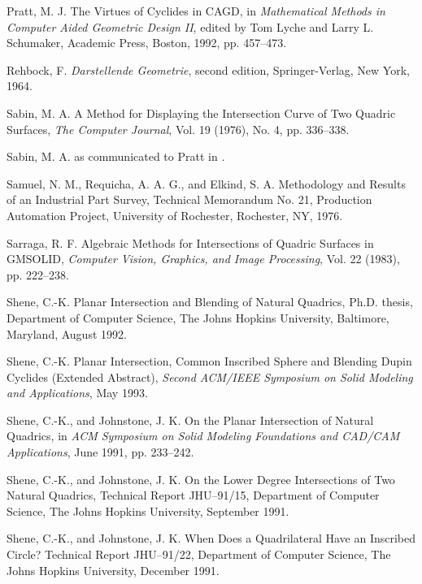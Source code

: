 \begin{thebibliography}{999}
     Pratt, M. J.
     The Virtues of Cyclides in CAGD,
     in {\em Mathematical Methods in Computer Aided Geometric Design II},
     edited by Tom Lyche and Larry L. Schumaker,
     Academic Press, Boston, 1992, pp. 457--473.

     Rehbock, F.
     {\em Darstellende Geometrie},
     second edition, Springer-Verlag, New York, 1964.

     Sabin, M. A.
     A Method for Displaying the Intersection Curve of Two Quadric Surfaces,
     {\em The Computer Journal},
     Vol. 19 (1976), No. 4, pp. 336--338.

     Sabin, M. A.
     as communicated to Pratt in \cite{pratt:1990}.

     Samuel, N. M., Requicha, A. A. G., and Elkind, S. A.
     Methodology and Results of an Industrial Part Survey,
     Technical Memorandum No. 21,
     Production Automation Project,
     University of Rochester, Rochester, NY, 1976.

     Sarraga, R. F.
     Algebraic Methods for Intersections of Quadric Surfaces in GMSOLID,
     {\em Computer Vision, Graphics, and Image Processing},
     Vol. 22 (1983), pp. 222--238.

     Shene, C.-K.
     Planar Intersection and Blending of Natural Quadrics,
     Ph.D. thesis,
     Department of Computer Science,
     The Johns Hopkins University,
     Baltimore, Maryland, August 1992.

     Shene, C.-K.
     Planar Intersection, Common Inscribed Sphere and Blending Dupin Cyclides
     (Extended Abstract),
     {\em Second ACM/IEEE Symposium on Solid Modeling and
     Applications}, May 1993.

     Shene, C.-K., and Johnstone, J. K.
     On the Planar Intersection of Natural Quadrics,
     in {\em ACM Symposium on Solid Modeling Foundations and
     CAD/CAM Applications}, June 1991, pp. 233--242.

     Shene, C.-K., and Johnstone, J. K.
     On the Lower Degree Intersections of Two Natural Quadrics,
     Technical Report JHU--91/15,
     Department of Computer Science,
     The Johns Hopkins University,
     September 1991.

     Shene, C.-K., and Johnstone, J. K.
     When Does a Quadrilateral Have an Inscribed Circle?
     Technical Report JHU--91/22,
     Department of Computer Science,
     The Johns Hopkins University,
     December 1991.


\end{thebibliography}
